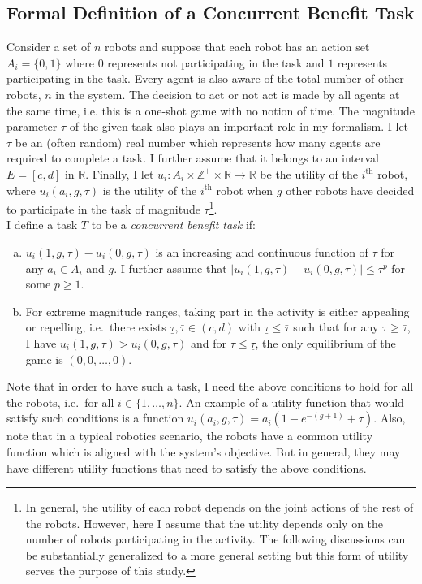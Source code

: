 \documentclass[defaultstyle,12pt]{proposal}
\def\Z{\mathbb{Z}}    %
\def\R{\mathbb{R}}    %
\begin{document}
\subsection{Formal Definition of a Concurrent Benefit Task}\label{subsec:conbenefitdef}
Consider a set of $n$ robots and suppose that each robot has an action set $A_i=\{0,1\}$ where $0$ represents not participating in the task and $1$ represents participating in the task. Every agent is also aware of the total number of other robots, $n$ in the system. The decision to act or not act is made by all agents at the same time, i.e. this is a one-shot game with no notion of time. The magnitude parameter $\tau$ of the given task also plays an important role in my formalism. I let $\tau$ be an (often random) real number which represents how many agents are required to complete a task. I further assume that it belongs to an interval $E=[c,d]$ in $\R$.  Finally, I let $u_i:A_i\times\Z^+\times \R\to \R$ be the utility of the $i^{\text{th}}$ robot, where $u_i(a_i,g,\tau)$ is the utility of the $i^{\text{th}}$ robot when $g$ other robots have decided to participate in the task of magnitude $\tau$\footnote{In general, the utility of each robot depends on the joint actions of the rest of the robots. However, here I assume that the utility depends only on the number of robots participating in the activity. The following discussions can be substantially generalized to a more general setting but this form of utility serves the purpose of this study.}.\\
I define a task $T$ to be a \emph{concurrent benefit task} if:
\begin{enumerate}[a.]
	\item $u_i(1,g,\tau)-u_i(0,g,\tau)$ is an increasing and continuous function of $\tau$ for any $a_i\in A_i$ and $g$. I further assume that $|u_i(1,g,\tau)-u_i(0,g,\tau)|\leq \tau^p$ for some $p\geq 1$. 
	\item For extreme magnitude ranges, taking part in the activity is either appealing or repelling, i.e.\ there exists $\underline{\tau},\bar{\tau}\in (c,d)$ with $\underline{\tau}\leq \bar{\tau}$ such that for any $\tau\geq \bar{\tau}$, I have $u_i(1,g,\tau)>u_i(0,g,\tau)$ and for $\tau\leq \underline{\tau}$, the only equilibrium of the game is $(0,0,\ldots,0)$. 
\end{enumerate}

Note that in order to have such a task, I need the above conditions to hold for all the robots, i.e.\ for all $i\in\{1,\ldots,n\}$.
An example of a utility function that would satisfy such conditions is a function $u_i(a_i,g,\tau)=a_i(1-e^{-(g+1)}+\tau)$. Also, note that in a typical robotics scenario, the robots have a common utility function which is aligned with the system's objective. But in general, they may have different utility functions that need to satisfy the above conditions. 
\end{document}
